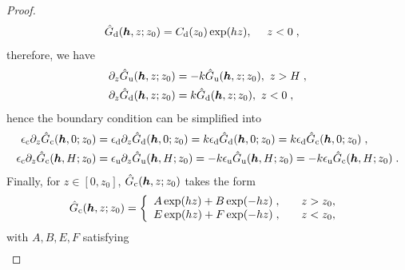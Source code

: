 \begin{proof}
\begin{align*}
     \Hat{G}_{\mathrm{d}}(\boldsymbol{h}, z; z_0)&=C_{\mathrm{d}}(z_0)\exp(h z),~~~~z < 0\;,
\end{align*}
therefore, we have 
\begin{align*}
    \partial_z\Hat{G}_{\mathrm{u}}(\boldsymbol{h}, z; z_0)&=-k\Hat{G}_{\mathrm{u}}(\boldsymbol{h}, z; z_0),~z > H\;,\\
     \partial_z\Hat{G}_{\mathrm{d}}(\boldsymbol{h}, z; z_0)&=k\Hat{G}_{\mathrm{d}}(\boldsymbol{h}, z; z_0),~z < 0\;,
\end{align*}
hence the boundary condition can be  simplified into
\begin{align*}
 \epsilon_{\mathrm{c}}\partial_z\Hat{G}_{\mathrm{c}}(\boldsymbol{h}, 0; z_0)&=\epsilon_{\mathrm{d}} \partial_z\Hat{G}_{\mathrm{d}}(\boldsymbol{h}, 0; z_0)=k\epsilon_{\mathrm{d}} \Hat{G}_{\mathrm{d}}(\boldsymbol{h}, 0; z_0)=k\epsilon_{\mathrm{d}} \Hat{G}_{\mathrm{c}}(\boldsymbol{h}, 0; z_0)\;,\\
  \epsilon_{\mathrm{c}}\partial_z\Hat{G}_{\mathrm{c}}(\boldsymbol{h}, H; z_0)&=\epsilon_{\mathrm{u}} \partial_z\Hat{G}_{\mathrm{u}}(\boldsymbol{h}, H; z_0)=-k\epsilon_{\mathrm{u}} \Hat{G}_{\mathrm{u}}(\boldsymbol{h}, H; z_0)=-k\epsilon_{\mathrm{u}} \Hat{G}_{\mathrm{c}}(\boldsymbol{h}, H; z_0)\;.
\end{align*} 
Finally, for $z\in[0, z_0]$, $\Hat{G}_{\mathrm{c}}(\boldsymbol{h}, z; z_0)$ takes the form
\begin{equation*}
    \Hat{G}_{\mathrm{c}}(\boldsymbol{h}, z; z_0)=\left \{
            \begin{array}{cc}
                \begin{aligned}
                    & A\exp(h z)+B\exp(-h z)\;,
                \end{aligned} & z>z_0, \\
                \begin{aligned}
                 & E\exp(h z)+F\exp(-h z)\;,
                \end{aligned} & z<z_0,
            \end{array}
        \right. \;
\end{equation*}
with $A, B, E, F$ satisfying
\begin{equation}\label{proof...Matrix}
\begin{aligned}

\end{aligned}
\end{equation}
\end{proof}
